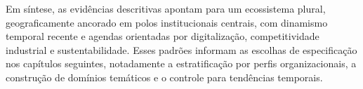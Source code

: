 Em síntese, as evidências descritivas apontam para um ecossistema plural, geograficamente ancorado em polos institucionais centrais, com dinamismo temporal recente e agendas orientadas por digitalização, competitividade industrial e sustentabilidade. Esses padrões informam as escolhas de especificação nos capítulos seguintes, notadamente a estratificação por perfis organizacionais, a construção de domínios temáticos e o controle para tendências temporais.

